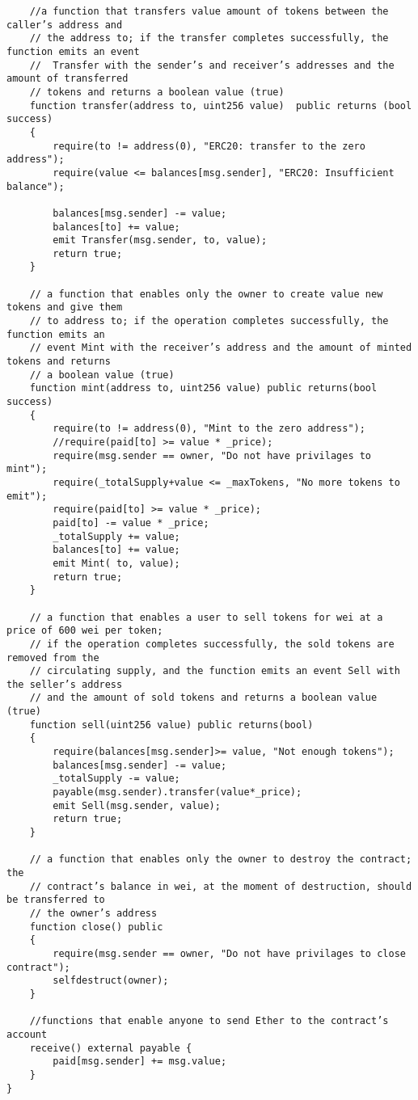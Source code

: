 \documentclass[12pt,addpoints,answers]{exam}
\begin{document}
\begin{questions}
\begin{parts}
\begin{solution}
\begin{verbatim}
    //a function that transfers value amount of tokens between the caller’s address and
    // the address to; if the transfer completes successfully, the function emits an event
    //  Transfer with the sender’s and receiver’s addresses and the amount of transferred
    // tokens and returns a boolean value (true)
    function transfer(address to, uint256 value)  public returns (bool success)
    {
        require(to != address(0), "ERC20: transfer to the zero address");
        require(value <= balances[msg.sender], "ERC20: Insufficient balance");

        balances[msg.sender] -= value;
        balances[to] += value;
        emit Transfer(msg.sender, to, value);
        return true;
    }

    // a function that enables only the owner to create value new tokens and give them
    // to address to; if the operation completes successfully, the function emits an
    // event Mint with the receiver’s address and the amount of minted tokens and returns
    // a boolean value (true)
    function mint(address to, uint256 value) public returns(bool success)
    {
        require(to != address(0), "Mint to the zero address");
        //require(paid[to] >= value * _price);
        require(msg.sender == owner, "Do not have privilages to mint");
        require(_totalSupply+value <= _maxTokens, "No more tokens to emit");
        require(paid[to] >= value * _price);
        paid[to] -= value * _price;
        _totalSupply += value;
        balances[to] += value;
        emit Mint( to, value);
        return true;
    }

    // a function that enables a user to sell tokens for wei at a price of 600 wei per token;
    // if the operation completes successfully, the sold tokens are removed from the
    // circulating supply, and the function emits an event Sell with the seller’s address
    // and the amount of sold tokens and returns a boolean value (true)
    function sell(uint256 value) public returns(bool)
    {
        require(balances[msg.sender]>= value, "Not enough tokens");
        balances[msg.sender] -= value;
        _totalSupply -= value;
        payable(msg.sender).transfer(value*_price);
        emit Sell(msg.sender, value);
        return true;
    }

    // a function that enables only the owner to destroy the contract; the
    // contract’s balance in wei, at the moment of destruction, should be transferred to
    // the owner’s address
    function close() public
    {
        require(msg.sender == owner, "Do not have privilages to close contract");
        selfdestruct(owner);
    }

    //functions that enable anyone to send Ether to the contract’s account
    receive() external payable {
        paid[msg.sender] += msg.value;
    }
}
\end{verbatim}
    \end{solution}

\end{parts}

\newpage


~\\

\end{questions}
\end{document}
